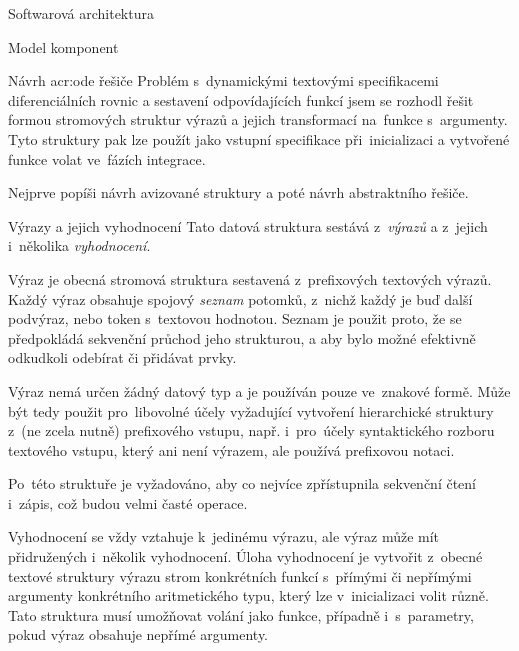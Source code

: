 \documentclass[thesis=M,czech]{FITthesis}[2012/06/26]
\newcommand{\acrlabel}[1]{acr:#1}
\newcommand{\acr}[1]{\acrshort{\acrlabel{#1}}}
\newcommand{\hl}[1]{\textit{#1}}
\newcommand{\name}[1]{\hl{#1}}
\begin{document}
\begin{section}{Softwarová architektura}
\begin{subsection}{Model komponent}

\end{subsection} %


\begin{subsection}{Návrh \acr{ode} řešiče}\label{ss:design:arch:ode}
Problém s~dynamickými textovými specifikacemi diferenciálních rovnic
a sestavení odpovídajících funkcí
jsem se rozhodl řešit formou stromových struktur výrazů
a jejich transformací na~funkce s~argumenty.
Tyto struktury pak lze použít jako vstupní specifikace při~inicializaci
a vytvořené funkce volat ve~fázích integrace.

Nejprve popíši návrh avizované struktury
a poté návrh abstraktního řešiče.


\begin{subsubsection}{Výrazy a jejich vyhodnocení}
\label{sss:design:arch:ode:exprs}
Tato datová struktura sestává
z~\name{výrazů} a z~jejich i~několika \hl{vyhodnocení}.


\begin{paragraph}{Výraz}\label{p:design:arch:ode:exprs:expr}
je obecná stromová struktura
sestavená z~prefixových textových výrazů.
Každý výraz obsahuje spojový \hl{seznam} potomků,
z~nichž každý je buď další podvýraz,
nebo token s~textovou hodnotou.
Seznam je použit proto,
že se předpokládá sekvenční průchod jeho strukturou,
a aby bylo možné efektivně odkudkoli odebírat či přidávat prvky.

Výraz nemá určen žádný datový typ
a je používán pouze ve~znakové formě.
Může být tedy použit pro~libovolné účely
vyžadující vytvoření hierarchické struktury
z~(ne zcela nutně) prefixového vstupu,
např. i~pro~účely syntaktického rozboru
textového vstupu, který ani není výrazem,
ale používá prefixovou notaci.

Po~této struktuře je vyžadováno,
aby co nejvíce zpřístupnila sekvenční čtení i~zápis,
což budou velmi časté operace.
\end{paragraph} %


\begin{paragraph}{Vyhodnocení}\label{p:design:arch:ode:exprs:eval}
se vždy vztahuje k~jedinému výrazu,
ale výraz může mít přidružených i~několik vyhodnocení.
Úloha vyhodnocení je vytvořit z~obecné textové struktury
výrazu strom konkrétních funkcí s~přímými či nepřímými argumenty
konkrétního aritmetického typu,
který lze v~inicializaci volit různě.
Tato struktura musí umožňovat volání jako funkce,
případně i~s~parametry,
pokud výraz obsahuje nepřímé argumenty.


\end{paragraph}
\end{subsubsection}
\end{subsection}
\end{section}
\end{document}
